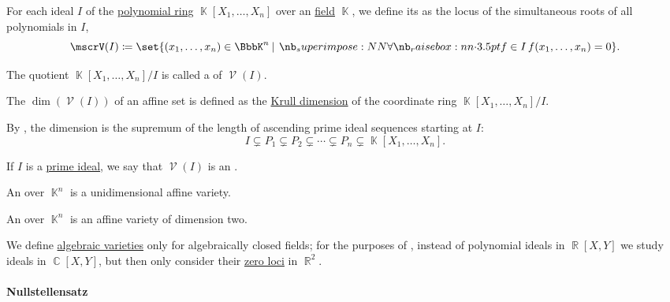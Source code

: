 \begin{definition}\label{def:affine_algebraic_set}
  For each ideal \( I \) of the \hyperref[def:polynomial_algebra]{polynomial ring} \( \BbbK[X_1, \ldots, X_n] \) over an  \hyperref[def:field]{field} \( \BbbK \), we define its  as the locus of the simultaneous roots of all polynomials in \( I \),
  \begin{equation*}
    \mscrV(I) \coloneqq \set{ (x_1, \ldots, x_n) \in \BbbK^n \given \qforall {f \in I} f(x_1, \ldots, x_n) = 0 }.
  \end{equation*}

  \begin{thmenum}
     The quotient \( \BbbK[X_1, \ldots, X_n] / I \) is called a  of \( \mscrV(I) \).

     The  \( \dim(\mscrV(I)) \) of an affine set is defined as the \hyperref[def:krull_dimension]{Krull dimension} of the coordinate ring \( \BbbK[X_1, \ldots, X_n] / I \).

    By , the dimension is the supremum of the length of ascending prime ideal sequences starting at \( I \):
    \begin{equation*}
      I \subsetneq P_1 \subsetneq P_2 \subsetneq \cdots \subsetneq P_n \subsetneq \BbbK[X_1, \ldots, X_n].
    \end{equation*}

     If \( I \) is a \hyperref[def:semiring_ideal/prime]{prime ideal}, we say that \( \mscrV(I) \) is an .

     An  over \( \BbbK^n \) is a unidimensional affine variety.

     An  over \( \BbbK^n \) is an affine variety of dimension two.
  \end{thmenum}
\end{definition}

\begin{remark}\label{rem:real_affine_varieties}
  We define \hyperref[def:affine_algebraic_set/variety]{algebraic varieties} only for algebraically closed fields; for the purposes of , instead of polynomial ideals in \( \BbbR[X, Y] \) we study ideals in \( \BbbC[X, Y] \), but then only consider their \hyperref[def:root_of_polynomial]{zero loci} in \( \BbbR^2 \).
\end{remark}

\paragraph{Nullstellensatz}

\begin{theorem}[Nullstellensatz]\label{thm:hilberts_nullstellensatz}
\end{theorem}
